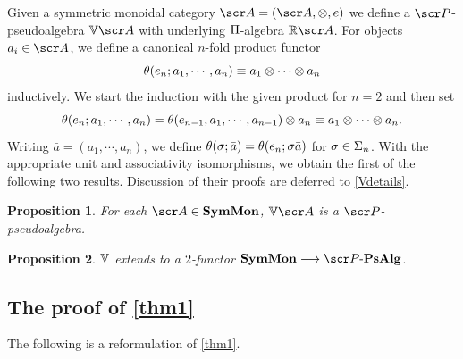 \documentclass{amsart}
\newtheorem{prop}{Proposition}[section]
\theoremstyle{definition}
\numberwithin{equation}{section}
\newcommand{\PPs}{\sP\text{-}\mathbf{PsAlg}}
\newcommand{\SM}{\mathbf{SymMon}}
\begin{document}
Given a symmetric monoidal category $\sA = (\sA,\otimes, e)$ we define a $\sP$-pseudoalgebra $\bV\sA$ with underlying $\Pi$-algebra $\bR\sA$.  For objects $a_i\in \sA$, we define a canonical $n$-fold product  functor
$$\theta(e_n; a_1, \cdots, a_n) \equiv  a_1\otimes \cdots \otimes a_n$$ 
inductively. We start the induction with the given product for $n=2$ and then set
$$\theta(e_n; a_1, \cdots, a_n) =  \theta(e_{n-1}, a_1, \cdots, a_{n-1}) \otimes a_n \equiv a_1 \otimes\cdots \otimes a_n.$$
Writing $\bar{a}=(a_1,\cdots,a_n)$, we define $\theta(\sigma; \bar{a}) = \theta(e_n; \sigma\bar{a})$ for $\sigma\in\Sigma_n$.  With the appropriate unit and associativity isomorphisms, we obtain the first of the following two results. Discussion of their proofs are deferred to \autoref{Vdetails}. 

\begin{prop}  For each $\sA\in \SM$, $\bV \sA$ is a $\sP$-pseudoalgebra. \label{VProp1}
\end{prop}

\begin{prop} $\mathbb{V}$ extends to a $2$-functor  $\SM \rtarr \PPs$. \label{VProp2} 
\end{prop}

 \subsection{The proof of \autoref{thm1}}\label{Sketch1}
 
 The following is a reformulation of \autoref{thm1}.
 
\end{document}
